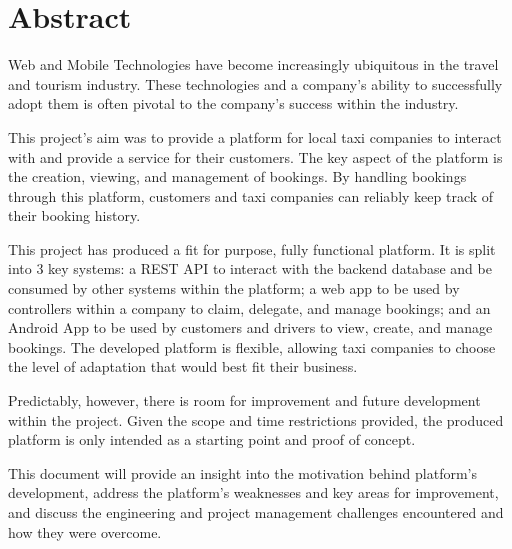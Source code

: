 \thispagestyle{empty}


\section*{\centering Abstract}

Web and Mobile Technologies have become increasingly ubiquitous in the travel and tourism industry. These technologies and a company's ability to successfully adopt them is often pivotal to the company's success within the industry.

This project's aim was to provide a platform for local taxi companies to interact with and provide a service for their customers. The key aspect of the platform is the creation, viewing, and management of bookings. By handling bookings through this platform, customers and taxi companies can reliably keep track of their booking history.

This project has produced a fit for purpose, fully functional platform. It is split into 3 key systems: a REST API to interact with the backend database and be consumed by other systems within the platform; a web app to be used by controllers within a company to claim, delegate, and manage bookings; and an Android App to be used by customers and drivers to view, create, and manage bookings. The developed platform is flexible, allowing taxi companies to choose the level of adaptation that would best fit their business.

Predictably, however, there is room for improvement and future development within the project. Given the scope and time restrictions provided, the produced platform is only intended as a starting point and proof of concept.

This document will provide an insight into the motivation behind platform's development, address the platform's weaknesses and key areas for improvement, and discuss the engineering and project management challenges encountered and how they were overcome.

